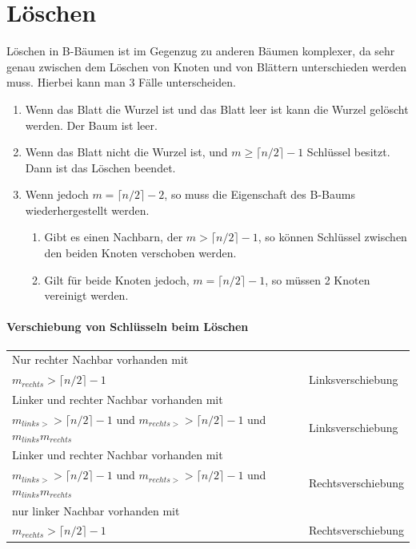 \section{L\"oschen}
L\"oschen in B-B\"aumen ist im Gegenzug zu anderen B\"aumen komplexer, da sehr genau zwischen dem L\"oschen von Knoten und von Bl\"attern unterschieden werden muss.
Hierbei kann man 3 F\"alle unterscheiden.
\begin{enumerate}
	\item Wenn das Blatt die Wurzel ist und das Blatt leer ist kann die Wurzel gel\"oscht werden. Der Baum ist leer.
	\item Wenn das Blatt nicht die Wurzel ist, und  $m\geq \lceil n/2\rceil-1$ Schl\"ussel besitzt. Dann ist das L\"oschen beendet.
	\item Wenn jedoch $m= \lceil n/2\rceil-2$, so muss die Eigenschaft des B-Baums wiederhergestellt werden.
		\begin{enumerate}
				\item Gibt es einen Nachbarn, der $m> \lceil n/2\rceil-1$, so k\"onnen Schl\"ussel zwischen den beiden Knoten verschoben werden.
				\item Gilt f\"ur beide Knoten jedoch, $m= \lceil n/2\rceil-1$, so m\"ussen 2 Knoten vereinigt werden.
		\end{enumerate}	
\end{enumerate}

\paragraph{Verschiebung von Schl\"usseln beim L\"oschen} 
\begin{tabular}{|l|l|}
	\hline Nur rechter Nachbar vorhanden mit\\ $m_{rechts}> \lceil n/2\rceil -1$  & Linksverschiebung  \\ 
	\hline Linker und rechter Nachbar vorhanden mit\\ $m_{links>}> \lceil n/2\rceil -1$ und $m_{rechts>}> \lceil n/2\rceil -1$ und $ m_{links} m_{rechts}$ & Linksverschiebung \\ 
	\hline Linker und rechter Nachbar vorhanden mit\\ $m_{links>}> \lceil n/2\rceil -1$ und $m_{rechts>}> \lceil n/2\rceil -1$ und $ m_{links} m_{rechts}$ & Rechtsverschiebung \\ 
	\hline nur linker Nachbar vorhanden mit\\ $m_{rechts}> \lceil n/2\rceil -1$ & Rechtsverschiebung \\ 
	\hline 
\end{tabular} 
